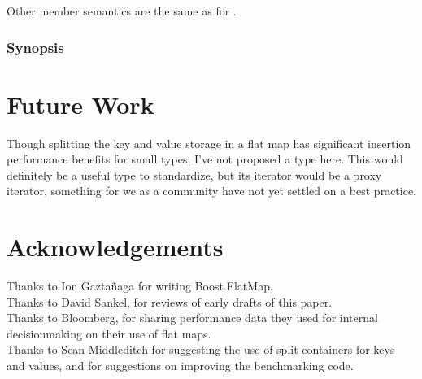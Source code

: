 Other member semantics are the same as for .

\subsubsection{ Synopsis}




\section{Future Work}

Though splitting the key and value storage in a flat map has significant
insertion performance benefits for small types, I've not proposed a
 type here.  This would definitely be a useful type to
standardize, but its iterator would be a proxy iterator, something for we as a
community have not yet settled on a best practice.


\section{Acknowledgements}

Thanks to Ion Gazta\~{n}aga for writing Boost.FlatMap.\\

Thanks to David Sankel, for reviews of early drafts of this paper.\\

Thanks to Bloomberg, for sharing performance data they used for internal
decisionmaking on their use of flat maps.\\

Thanks to Sean Middleditch for suggesting the use of split containers for keys
and values, and for suggestions on improving the benchmarking code.
